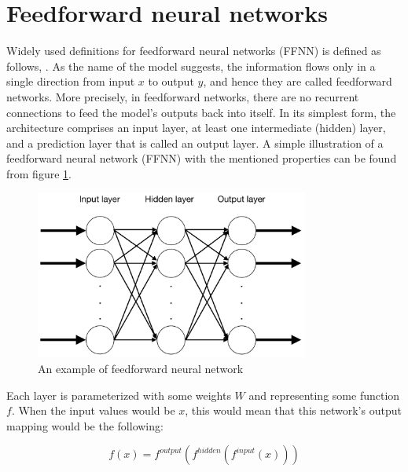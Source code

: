 \section{Feedforward neural networks}

Widely used definitions for feedforward neural networks (FFNN) is defined as follows,  \parencite[p.~167]{goodfellow2016deep}. As the name of the model suggests, the information flows only in a single direction from input $x$ to output $y$, and hence they are called feedforward networks. More precisely, in feedforward networks, there are no recurrent connections to feed the model's outputs back into itself. In its simplest form, the architecture comprises an input layer, at least one intermediate (hidden) layer, and a prediction layer that is called an output layer. A simple illustration of a feedforward neural network (FFNN) with the mentioned properties can be found from figure \ref{fig:ffnn}.

\begin{figure}[h]
    \centering
    \includegraphics[width=9cm,height=\textheight,keepaspectratio]{ffnn}
    \caption{An example of feedforward neural network}
    \label{fig:ffnn}
\end{figure}

Each layer is parameterized with some weights $W$ and representing some function $f$. When the input values would be $x$, this would mean that this network's output mapping would be the following: 

\begin{equation}
    f(x) = f^{output} \left (f^{hidden}( f^{input}(x) )  \right )
\end{equation}

